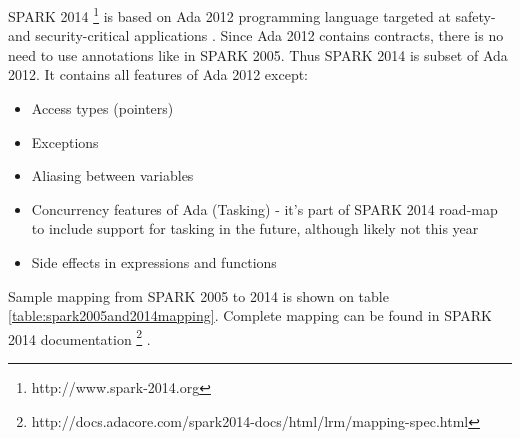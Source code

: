 SPARK 2014 \footnote{http://www.spark-2014.org} is based on Ada 2012 programming language targeted at safety- and security-critical applications \cite{Spark2014:Paper}. Since Ada 2012 contains contracts, there is no need to use annotations like in SPARK 2005. Thus SPARK 2014 is subset of Ada 2012. It contains all features of Ada 2012 except:
\begin{itemize} \itemsep1pt \parskip0pt 
 	\item Access types (pointers)
 	\item Exceptions
	\item Aliasing between variables
	\item Concurrency features of Ada (Tasking) - it's part of SPARK 2014 road-map to include support for tasking in the future, although likely not this year
	\item Side effects in expressions and functions
\end{itemize}

Sample mapping from SPARK 2005 to 2014 is shown on table \ref{table:spark2005and2014mapping}. Complete mapping can be found in SPARK 2014 documentation \footnote{http://docs.adacore.com/spark2014-docs/html/lrm/mapping-spec.html} \cite{Spark2014refManual:Online}.

